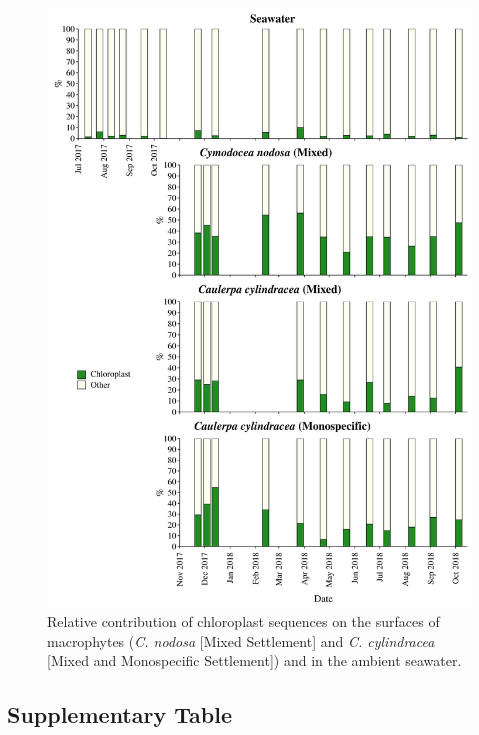 \documentclass[12pt,]{article}
\begin{document}
\begin{figure}[H]

{\centering \includegraphics[width=0.85\linewidth]{../results/figures/chloroplast_bar_plot} 

}

\caption{Relative contribution of chloroplast sequences on the surfaces of macrophytes (\textit{C. nodosa} [Mixed Settlement] and \textit{C. cylindracea} [Mixed and Monospecific Settlement]) and in the ambient seawater.\label{chloroplast}}\label{fig:unnamed-chunk-3}
\end{figure}

\hypertarget{supplementary-table}{%
\subsection{Supplementary Table}\label{supplementary-table}}

\begingroup\fontsize{9}{11}\selectfont
\end{document}
